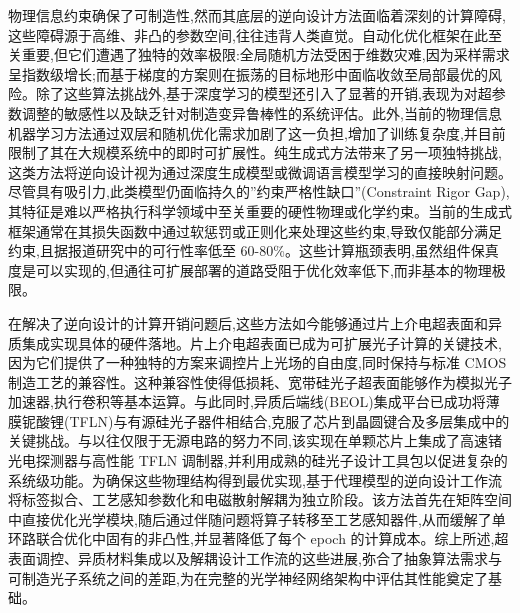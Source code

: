 \documentclass[11pt]{article}
\begin{document}
物理信息约束确保了可制造性,然而其底层的逆向设计方法面临着深刻的计算障碍,这些障碍源于高维、非凸的参数空间,往往违背人类直觉。自动化优化框架在此至关重要,但它们遭遇了独特的效率极限:全局随机方法受困于维数灾难,因为采样需求呈指数级增长;而基于梯度的方案则在振荡的目标地形中面临收敛至局部最优的风险。除了这些算法挑战外,基于深度学习的模型还引入了显著的开销,表现为对超参数调整的敏感性以及缺乏针对制造变异鲁棒性的系统评估。此外,当前的物理信息机器学习方法通过双层和随机优化需求加剧了这一负担,增加了训练复杂度,并目前限制了其在大规模系统中的即时可扩展性。纯生成式方法带来了另一项独特挑战,这类方法将逆向设计视为通过深度生成模型或微调语言模型学习的直接映射问题。尽管具有吸引力,此类模型仍面临持久的''约束严格性缺口''(Constraint Rigor Gap),其特征是难以严格执行科学领域中至关重要的硬性物理或化学约束。当前的生成式框架通常在其损失函数中通过软惩罚或正则化来处理这些约束,导致仅能部分满足约束,且据报道研究中的可行性率低至 60-80\%。这些计算瓶颈表明,虽然组件保真度是可以实现的,但通往可扩展部署的道路受阻于优化效率低下,而非基本的物理极限。\citep{doi_10_48550_arxiv_2602_18148_e9c0a72b} \citep{doi_10_29026_oes_2022_210012_27973a69} \citep{doi_10_55041_ijsrem43509_b9a7bd5e} \citep{doi_10_48550_arxiv_2511_00070_bf8eda11}

在解决了逆向设计的计算开销问题后,这些方法如今能够通过片上介电超表面和异质集成实现具体的硬件落地。片上介电超表面已成为可扩展光子计算的关键技术,因为它们提供了一种独特的方案来调控片上光场的自由度,同时保持与标准 CMOS 制造工艺的兼容性。这种兼容性使得低损耗、宽带硅光子超表面能够作为模拟光子加速器,执行卷积等基本运算。与此同时,异质后端线(BEOL)集成平台已成功将薄膜铌酸锂(TFLN)与有源硅光子器件相结合,克服了芯片到晶圆键合及多层集成中的关键挑战。与以往仅限于无源电路的努力不同,该实现在单颗芯片上集成了高速锗光电探测器与高性能 TFLN 调制器,并利用成熟的硅光子设计工具包以促进复杂的系统级功能。为确保这些物理结构得到最优实现,基于代理模型的逆向设计工作流将标签拟合、工艺感知参数化和电磁散射解耦为独立阶段。该方法首先在矩阵空间中直接优化光学模块,随后通过伴随问题将算子转移至工艺感知器件,从而缓解了单环路联合优化中固有的非凸性,并显著降低了每个 epoch 的计算成本。综上所述,超表面调控、异质材料集成以及解耦设计工作流的这些进展,弥合了抽象算法需求与可制造光子系统之间的差距,为在完整的光学神经网络架构中评估其性能奠定了基础。\citep{doi_10_1515_nanoph_2022_0294_1bd118d5} \citep{s2_9b444e84d20ae6e3d62d2d4df30268b5a53baad2_40af2cc9} \citep{s2_753a5d83a96e0194da93bcb6f20fa0bd356e37fa_c11e3796}
\end{document}
